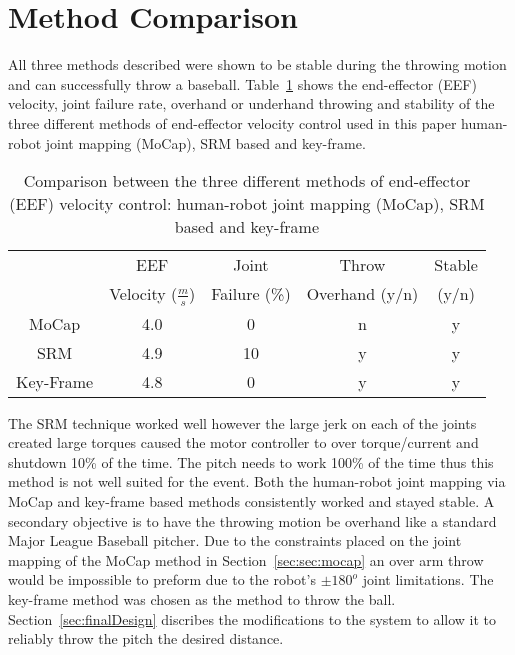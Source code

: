\section{Method Comparison}\label{sec:comparison}
All three methods described were shown to be stable during the throwing motion and can successfully throw a baseball.  Table~\ref{table:comp} shows the end-effector (EEF) velocity, joint failure rate, overhand or underhand throwing and stability of the three different methods of end-effector velocity control used in this paper human-robot joint mapping (MoCap), SRM based and key-frame.

\begin{table}[!t]
\renewcommand{\arraystretch}{1.3}
\caption{Comparison between the three different methods of end-effector (EEF) velocity control: human-robot joint mapping (MoCap), SRM based and key-frame}
\label{table:comp}
\centering
\begin{tabular}{|c|c|c|c|c|}
\hline
  				& EEF 																	& Joint 						& Throw						& Stable  			\\
  				& Velocity ($\frac{m}{s}$)							& Failure (\%)			& Overhand (y/n)	& (y/n)					\\
\hline	
MoCap 		& 4.0																		& 0									& n								& y 						\\
\hline
SRM 			& 4.9																		& 10								& y								& y							\\
\hline
Key-Frame & 4.8 																	& 0 								& y								&	y							\\
\hline
\end{tabular}
\end{table}

The SRM technique worked well however the large jerk on each of the joints created large torques caused the motor controller to over torque/current and shutdown 10\% of the time.  
The pitch needs to work 100\% of the time thus this method is not well suited for the event.  
Both the human-robot joint mapping via MoCap and key-frame based methods consistently worked and stayed stable.  A secondary objective is to have the throwing motion be overhand like a standard Major League Baseball pitcher.  
Due to the constraints placed on the joint mapping of the MoCap method in Section~\ref{sec:sec:mocap} an over arm throw would be impossible to preform due to the robot's $\pm180^o$ joint limitations.  The key-frame method was chosen as the method to throw the ball.  Section~\ref{sec:finalDesign} discribes the modifications to the system to allow it to reliably throw the pitch the desired distance.